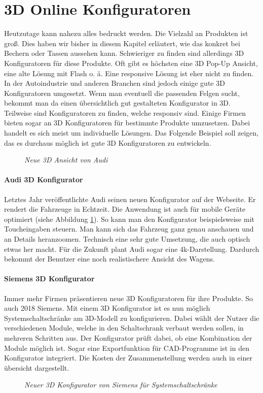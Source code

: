 \section{3D Online Konfiguratoren}
\label{sec:3dconfigurators}
%
Heutzutage kann nahezu alles bedruckt werden. Die Vielzahl an Produkten ist groß. Dies haben wir bisher in diesem Kapitel erläutert, wie das konkret bei Bechern oder Tassen aussehen kann. Schwieriger zu finden sind allerdings 3D Konfiguratoren für diese Produkte. Oft gibt es höchsten eine 3D Pop-Up Ansicht, eine alte Lösung mit Flash o. ä. Eine responsive Lösung ist eher nicht zu finden. \\
In der Autoindustrie und anderen Branchen sind jedoch einige gute 3D Konfiguratoren umgesetzt. Wenn man eventuell die passenden Felgen sucht, bekommt man da einen übersichtlich gut gestalteten Konfigurator in 3D. Teilweise sind Konfiguratoren zu finden, welche responsiv sind. Einige Firmen bieten sogar an 3D Konfiguratoren für bestimmte Produkte umzusetzen. Dabei handelt es sich meist um individuelle Lösungen. Das Folgende Beispiel soll zeigen, das es durchaus möglich ist gute 3D Konfiguratoren zu entwickeln.
%
\begin{figure}[]
	\centering
	{}
	\caption[Audi Konfigurator]{\textit{Neue 3D Ansicht von Audi}}
	\label{fig:audi}
\end{figure}
%
%
\paragraph{Audi 3D Konfigurator}Letztes Jahr veröffentlichte Audi seinen neuen Konfigurator auf der Webseite. Er rendert die Fahrzeuge in Echtzeit. Die Anwendung ist auch für mobile Geräte optimiert (siehe Abbildung \ref{fig:audi}). So kann man den Konfigurator beispielsweise mit Toucheingaben steuern. Man kann sich das Fahrzeug ganz genau anschauen und an Details heranzoomen. Technisch eine sehr gute Umsetzung, die auch optisch etwas her macht. Für die Zukunft plant Audi sogar eine 4k-Darstellung. Dardurch bekommt der Benutzer eine noch realistischere Ansicht des Wagens. \\
%
%
\paragraph{Siemens 3D Konfigurator}Immer mehr Firmen präsentieren neue 3D Konfiguratoren für ihre Produkte. So auch 2018 Siemens. Mit einem 3D Konfigurator ist es nun möglich Systemschaltschränke am 3D-Modell zu konfigurieren. Dabei wählt der Nutzer die verschiedenen Module, welche in den Schaltschrank verbaut werden sollen, in mehreren Schritten aus. Der Konfigurator prüft dabei, ob eine Kombination der Module möglich ist. Sogar eine Exportfunktion für CAD-Programme ist in den Konfigurator integriert. Die Kosten der Zusammenstellung werden auch in einer übersicht dargestellt.\\
%
\begin{figure}[]
	\centering
	{}
	\caption[Siemens Konfigurator]{\textit{Neuer 3D Konfigurator von Siemens für Systemschaltschränke}}
	\label{fig:siemens}
\end{figure}
%
